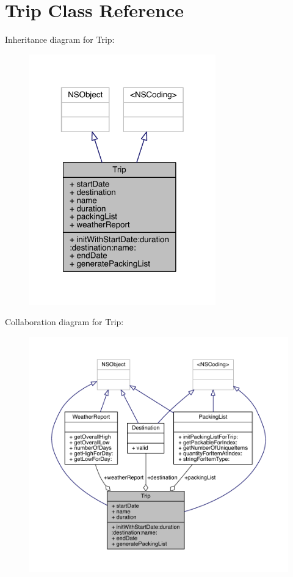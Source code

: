 \hypertarget{interface_trip}{\section{Trip Class Reference}
\label{interface_trip}
}


Inheritance diagram for Trip\-:\nopagebreak
\begin{figure}[H]
\begin{center}
\leavevmode
\includegraphics[width=229pt]{interface_trip__inherit__graph}
\end{center}
\end{figure}


Collaboration diagram for Trip\-:\nopagebreak
\begin{figure}[H]
\begin{center}
\leavevmode
\includegraphics[width=350pt]{interface_trip__coll__graph}
\end{center}
\end{figure}
